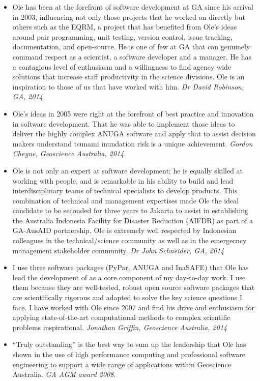 \documentclass[11pt,a4paper]{article}
\begin{document}
\begin{itemize}
  \item Ole has been at the forefront of software development at GA since his arrival in 2003, influencing not only those projects that he worked on directly but others such as the EQRM, a project that has benefited from Ole’s ideas around pair programming, unit testing, version control, issue tracking, documentation, and open-source. He is one of few at GA that can genuinely command respect as a scientist, a software developer and a manager.  He has a contagious level of enthusiasm and a willingness to find agency wide solutions that increase staff productivity in the science divisions. Ole is an inspiration to those of us that have worked with him. %
  \emph{Dr David Robinson, GA, 2014}
  \item Ole’s ideas in 2005 were right at the forefront of best practice and innovation in software development. That he was able to implement those ideas to deliver the highly complex ANUGA software and apply that to assist decision makers understand tsunami inundation risk is a unique achievement. \emph{Gordon Cheyne, Geoscience Australia, 2014}.
  \item Ole is not only an expert at software development; he is equally skilled at working with people, and is remarkable in his ability to build and lead interdisciplinary teams of technical specialists to develop products. This combination of technical and management expertises made Ole the ideal candidate to be seconded for three years to Jakarta to assist in establishing the Australia Indonesia Facility for Disaster Reduction (AIFDR) as part of a GA-AusAID portnership. Ole is extremely well respected by Indonesian colleagues in the technical/science community as well as in the emergecncy management stakeholder community. \emph{Dr John Schneider, GA, 2014}
  \item I use three software packages (PyPar, ANUGA and InaSAFE) that Ole has lead the development of as a core component of my day-to-day work. I use them because they are well-tested, robust open source software packages that are scientifically rigorous and adapted to solve the key science questions I face. I have worked with Ole since 2007 and find his drive and enthusiasm for applying state-of-the-art computational methods to complex scientific problems inspirational. \emph{Jonathan Griffin, Geoscience Australia, 2014}
  \item “Truly outstanding” is the best way to sum up the leadership that Ole has shown in the use of high performance computing and professional software engineering to support a wide range of applications within Geoscience Australia. \emph{GA AGM award 2008}.

\end{itemize}
\end{document}

